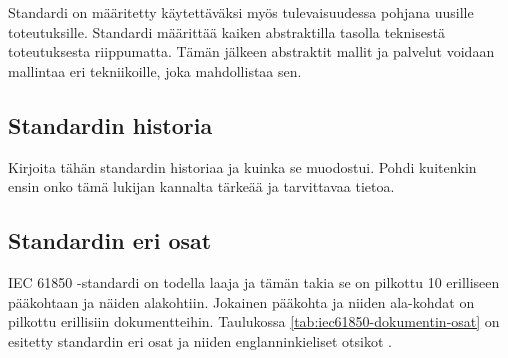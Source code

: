 Standardi on määritetty käytettäväksi myös tulevaisuudessa pohjana uusille toteutuksille. Standardi määrittää kaiken abstraktilla tasolla teknisestä toteutuksesta riippumatta. Tämän jälkeen abstraktit mallit ja palvelut voidaan mallintaa eri tekniikoille, joka mahdollistaa sen. \cite[s.~2]{Brunner2008}

\subsection{Standardin historia}
\begin{it}
	Kirjoita tähän standardin historiaa ja kuinka se muodostui. Pohdi kuitenkin ensin onko tämä lukijan kannalta tärkeää ja tarvittavaa tietoa.
\end{it}

\subsection{Standardin eri osat}
IEC 61850 -standardi on todella laaja ja tämän takia se on pilkottu 10 erilliseen pääkohtaan ja näiden alakohtiin. Jokainen pääkohta ja niiden ala-kohdat on pilkottu erillisiin dokumentteihin. Taulukossa \ref{tab:iec61850-dokumentin-osat} on esitetty standardin eri osat ja niiden englanninkieliset otsikot \cite[s.~2]{Mackiewicz2006}.

